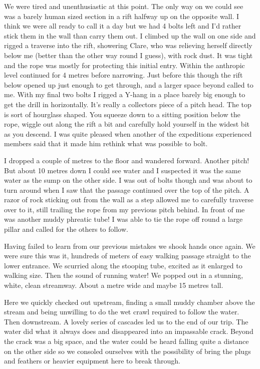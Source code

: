 We were tired and unenthusiastic at this point. The only way on we could see was a barely human sized section in a rift halfway up on the opposite wall. I think we were all ready to call it a day but we had 4 bolts left and I’d rather stick them in the wall than carry them out. I climbed up the wall on one side and rigged a traverse into the rift, showering Clare, who was relieving herself directly below me (better than the other way round I guess), with rock dust. It was tight and the rope was mostly for protecting this initial entry. Within the anthropic level continued for 4 metres before narrowing. Just before this though the rift below opened up just enough to get through, and a larger space beyond called to me. With my final two bolts I rigged a Y-hang in a place barely big enough to get the drill in horizontally. It’s really a collectors piece of a pitch head. The top is sort of hourglass shaped. You squeeze down to a sitting position below the rope, wiggle out along the rift a bit and carefully hold yourself in the widest bit as you descend. I was quite pleased when another of the expeditions experienced members said that it made him rethink what was possible to bolt.


 
I dropped a couple of metres to the floor and wandered forward. Another pitch! But about 10 metres down I could see water and I suspected it was the same water as the sump on the other side. I was out of bolts though and was about to turn around when I saw that the passage continued over the top of the pitch. A razor of rock sticking out from the wall as a step allowed me to carefully traverse over to it, still trailing the rope from my previous pitch behind. In front of me was another muddy phreatic tube! I was able to tie the rope off round a large pillar and called for the others to follow.

 
Having failed to learn from our previous mistakes we shook hands once again. We were sure this was it, hundreds of meters of easy walking passage straight to the lower entrance. We scurried along the stooping tube, excited as it enlarged to walking size. Then the sound of running water! We popped out in a stunning, white, clean streamway. About a metre wide and maybe 15 metres tall.


 
Here we quickly checked out upstream, finding a small muddy chamber above the stream and being unwilling to do the wet crawl required to follow the water. Then downstream. A lovely series of cascades led us to the end of our trip. The water did what it always does and disappeared into an impassable crack. Beyond the crack was a big space, and the water could be heard falling quite a distance on the other side so we consoled ourselves with the possibility of bring the plugs and feathers or heavier equipment here to break through.
 

